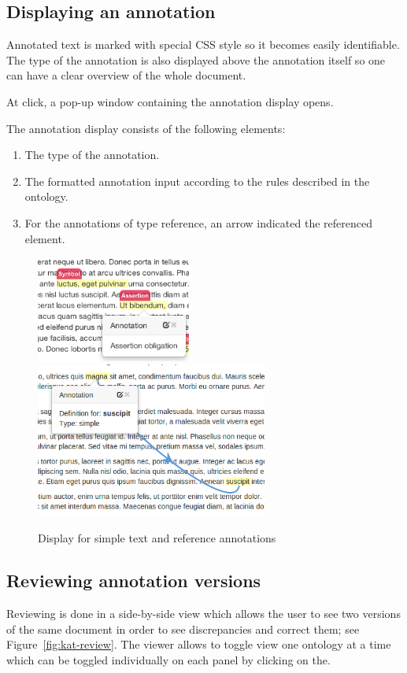 \subsection{Displaying an annotation}

Annotated text is marked with special CSS style so it becomes easily identifiable.  The
type of the annotation is also displayed above the annotation itself so one can have a
clear overview of the whole document.

At click, a pop-up window containing the annotation display opens.

The annotation display consists of the following elements:
\begin{enumerate}
\item The type of the annotation.
\item The formatted annotation input according to the rules described in the ontology.
\item For the annotations of type reference, an arrow indicated the referenced element.
\end{enumerate}

\begin{figure}[ht]\centering
\includegraphics[width=2in]{../PIC/suscipit}
\includegraphics[width=3in]{../PIC/definition}
\caption{Display for simple text and reference annotations}\label{fig:suscipit-definition}
\end{figure}

\subsection{Reviewing annotation versions}
Reviewing is done in a side-by-side view which allows the user to see two versions of the
same document in order to see discrepancies and correct them; see
Figure~\ref{fig:kat-review}. The viewer allows to toggle view one ontology at a time which
can be toggled individually on each panel by clicking on the.

